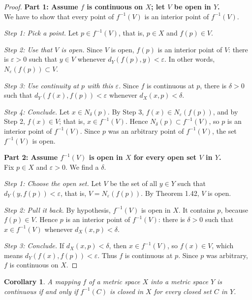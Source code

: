 \documentclass{article}
\theoremstyle{mythm}
\newtheorem{corollary}{Corollary}[theorem]
\begin{document}
\begin{proof}
\textbf{Part 1: Assume $f$ is continuous on $X$; let $V$ be open in $Y$.}\\
We have to show that every point of $f^{-1}(V)$ is an interior point of $f^{-1}(V)$.

\textit{Step 1: Pick a point.} Let $p \in f^{-1}(V)$, that is, $p \in X$ and $f(p) \in V$.

\textit{Step 2: Use that $V$ is open.} Since $V$ is open, $f(p)$ is an interior point of $V$: there is $\varepsilon > 0$ such that $y \in V$ whenever $d_Y(f(p), y) < \varepsilon$. In other words, $N_\varepsilon(f(p)) \subset V$.

\textit{Step 3: Use continuity at $p$ with this $\varepsilon$.} Since $f$ is continuous at $p$, there is $\delta > 0$ such that $d_Y(f(x), f(p)) < \varepsilon$ whenever $d_X(x,p) < \delta$.

\textit{Step 4: Conclude.} Let $x \in N_\delta(p)$. By Step 3, $f(x) \in N_\varepsilon(f(p))$, and by Step 2, $f(x) \in V$; that is, $x \in f^{-1}(V)$. Hence $N_\delta(p) \subset f^{-1}(V)$, so $p$ is an interior point of $f^{-1}(V)$. Since $p$ was an arbitrary point of $f^{-1}(V)$, the set $f^{-1}(V)$ is open.

\textbf{Part 2: Assume $f^{-1}(V)$ is open in $X$ for every open set $V$ in $Y$.}\\
Fix $p \in X$ and $\varepsilon > 0$. We find a $\delta$.

\textit{Step 1: Choose the open set.} Let $V$ be the set of all $y \in Y$ such that $d_Y(y, f(p)) < \varepsilon$, that is, $V = N_\varepsilon(f(p))$. By Theorem 1.42, $V$ is open.

\textit{Step 2: Pull it back.} By hypothesis, $f^{-1}(V)$ is open in $X$. It contains $p$, because $f(p) \in V$. Hence $p$ is an interior point of $f^{-1}(V)$: there is $\delta > 0$ such that $x \in f^{-1}(V)$ whenever $d_X(x,p) < \delta$.

\textit{Step 3: Conclude.} If $d_X(x,p) < \delta$, then $x \in f^{-1}(V)$, so $f(x) \in V$, which means $d_Y(f(x), f(p)) < \varepsilon$. Thus $f$ is continuous at $p$. Since $p$ was arbitrary, $f$ is continuous on $X$.
\end{proof}

\begin{corollary}\label{cor:closedpre}
A mapping $f$ of a metric space $X$ into a metric space $Y$ is continuous if and only if $f^{-1}(C)$ is closed in $X$ for every closed set $C$ in $Y$.
\end{corollary}
\end{document}
